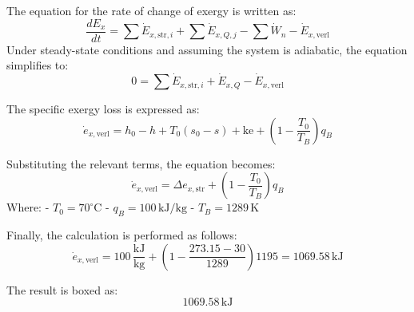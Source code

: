 The equation for the rate of change of exergy is written as:  
\[
\frac{dE_x}{dt} = \sum \dot{E}_{x,\text{str},i} + \sum \dot{E}_{x,Q,j} - \sum \dot{W}_n - \dot{E}_{x,\text{verl}}
\]  
Under steady-state conditions and assuming the system is adiabatic, the equation simplifies to:  
\[
0 = \sum \dot{E}_{x,\text{str},i} + \dot{E}_{x,Q} - \dot{E}_{x,\text{verl}}
\]  

The specific exergy loss is expressed as:  
\[
\dot{e}_{x,\text{verl}} = h_0 - h + T_0(s_0 - s) + \text{ke} + \left( 1 - \frac{T_0}{T_B} \right) q_B
\]  

Substituting the relevant terms, the equation becomes:  
\[
\dot{e}_{x,\text{verl}} = \Delta e_{x,\text{str}} + \left( 1 - \frac{T_0}{T_B} \right) q_B
\]  
Where:  
- \( T_0 = 70^\circ\text{C} \)  
- \( q_B = 100 \, \text{kJ/kg} \)  
- \( T_B = 1289 \, \text{K} \)  

Finally, the calculation is performed as follows:  
\[
\dot{e}_{x,\text{verl}} = 100 \, \frac{\text{kJ}}{\text{kg}} + \left( 1 - \frac{273.15 - 30}{1289} \right) 1195 = 1069.58 \, \text{kJ}
\]  

The result is boxed as:  
\[
\boxed{1069.58 \, \text{kJ}}
\]